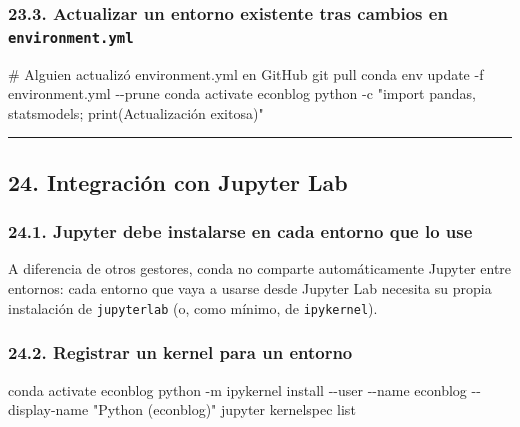 \documentclass[
  doc,
  floatsintext,
  longtable,
  a4paper,
  nolmodern,
  notxfonts,
  notimes,
  12pt,
  colorlinks=true,linkcolor=blue,citecolor=blue,urlcolor=blue]{apa7}
\newenvironment{Shaded}{\begin{snugshade}}{\end{snugshade}}
\newcommand{\AttributeTok}[1]{\textcolor[rgb]{0.40,0.45,0.13}{#1}}
\newcommand{\CommentTok}[1]{\textcolor[rgb]{0.37,0.37,0.37}{#1}}
\newcommand{\ExtensionTok}[1]{\textcolor[rgb]{0.00,0.23,0.31}{#1}}
\newcommand{\FunctionTok}[1]{\textcolor[rgb]{0.28,0.35,0.67}{#1}}
\newcommand{\NormalTok}[1]{\textcolor[rgb]{0.00,0.23,0.31}{#1}}
\newcommand{\StringTok}[1]{\textcolor[rgb]{0.13,0.47,0.30}{#1}}
\begin{document}
\subsubsection{\texorpdfstring{23.3. Actualizar un entorno existente
tras cambios en
\texttt{environment.yml}}{23.3. Actualizar un entorno existente tras cambios en environment.yml}}\label{actualizar-un-entorno-existente-tras-cambios-en-environment.yml}

\begin{Shaded}
\begin{Highlighting}[]
\CommentTok{\# Alguien actualizó environment.yml en GitHub}
\FunctionTok{git}\NormalTok{ pull}
\ExtensionTok{conda}\NormalTok{ env update }\AttributeTok{{-}f}\NormalTok{ environment.yml }\AttributeTok{{-}{-}prune}
\ExtensionTok{conda}\NormalTok{ activate econblog}
\ExtensionTok{python} \AttributeTok{{-}c} \StringTok{"import pandas, statsmodels; print(\textquotesingle{}Actualización exitosa\textquotesingle{})"}
\end{Highlighting}
\end{Shaded}

\begin{center}\rule{0.5\linewidth}{0.5pt}\end{center}

\subsection{24. Integración con Jupyter
Lab}\label{integraciuxf3n-con-jupyter-lab}

\subsubsection{24.1. Jupyter debe instalarse en cada entorno que lo
use}\label{jupyter-debe-instalarse-en-cada-entorno-que-lo-use}

A diferencia de otros gestores, conda no comparte automáticamente
Jupyter entre entornos: cada entorno que vaya a usarse desde Jupyter Lab
necesita su propia instalación de \texttt{jupyterlab} (o, como mínimo,
de \texttt{ipykernel}).

\subsubsection{24.2. Registrar un kernel para un
entorno}\label{registrar-un-kernel-para-un-entorno}

\begin{Shaded}
\begin{Highlighting}[]
\ExtensionTok{conda}\NormalTok{ activate econblog}
\ExtensionTok{python} \AttributeTok{{-}m}\NormalTok{ ipykernel install }\AttributeTok{{-}{-}user} \AttributeTok{{-}{-}name}\NormalTok{ econblog }\AttributeTok{{-}{-}display{-}name} \StringTok{"Python (econblog)"}
\ExtensionTok{jupyter}\NormalTok{ kernelspec list}
\end{Highlighting}
\end{Shaded}
\end{document}
